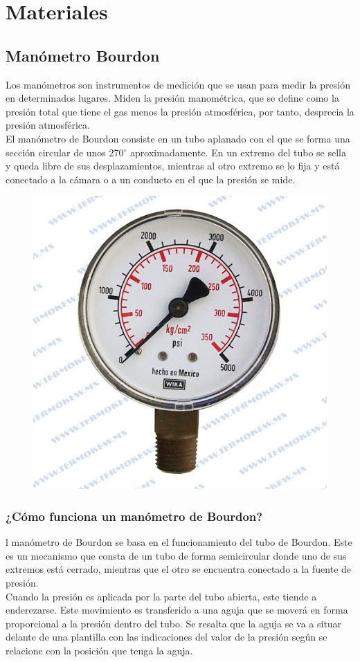 \documentclass[a4paper,12pt]{report}
\begin{document}
\chapter{Materiales}
\section{Manómetro Bourdon}
Los manómetros son instrumentos de medición que se usan para medir la presión en determinados lugares. Miden la presión manométrica, que se define como la presión total que tiene el gas menos la presión atmosférica, por tanto, desprecia la presión atmosférica.\\
El manómetro de Bourdon consiste en un tubo aplanado con el que se forma una sección circular de unos 270$^{\circ}$ aproximadamente. En un extremo del tubo se sella y queda libre de sus desplazamientos, mientras al otro extremo se lo fija y está conectado a la cámara o a un conducto en el que la presión se mide.
\begin{figure}[H]
\centering
\includegraphics[scale=1.2]{bourdon1.png}
\end{figure}
\subsection{¿Cómo funciona un manómetro de Bourdon?}
l manómetro de Bourdon se basa en el funcionamiento del tubo de Bourdon. Este es un mecanismo que consta de un tubo de forma semicircular donde uno de sus extremos está cerrado, mientras que el otro se encuentra conectado a la fuente de presión.\\
Cuando la presión es aplicada por la parte del tubo abierta, este tiende a enderezarse. Este movimiento es transferido a una aguja que se moverá en forma proporcional a la presión dentro del tubo. Se resalta que la aguja se va a situar delante de una plantilla con las indicaciones del valor de la presión según se relacione con la posición que tenga la aguja.
\end{document}
